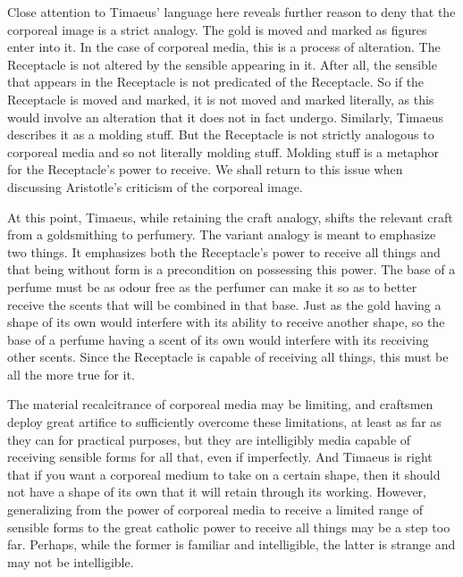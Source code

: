 Close attention to Timaeus' language here reveals further reason to deny that the corporeal image is a strict analogy. The gold is moved and marked as figures enter into it. In the case of corporeal media, this is a process of alteration. The Receptacle is not altered by the sensible appearing in it. After all, the sensible that appears in the Receptacle is not predicated of the Receptacle. So if the Receptacle is moved and marked, it is not moved and marked literally, as this would involve an alteration that it does not in fact undergo. Similarly, Timaeus describes it as a molding stuff. But the Receptacle is not strictly analogous to corporeal media and so not literally molding stuff. Molding stuff is a metaphor for the Receptacle's power to receive. We shall return to this issue when discussing Aristotle's criticism of the corporeal image.


At this point, Timaeus, while retaining the craft analogy, shifts the relevant craft from a goldsmithing to perfumery. The variant analogy is meant to emphasize two things. It emphasizes both the Receptacle's power to receive all things and that being without form is a precondition on possessing this power. The base of a perfume must be as odour free as the perfumer can make it so as to better receive the scents that will be combined in that base. Just as the gold having a shape of its own would interfere with its ability to receive another shape, so the base of a perfume having a scent of its own would interfere with its receiving other scents. Since the Receptacle is capable of receiving all things, this must be all the more true for it.

The material recalcitrance of corporeal media may be limiting, and craftsmen deploy great artifice to sufficiently overcome these limitations, at least as far as they can for practical purposes, but they are intelligibly media capable of receiving sensible forms for all that, even if imperfectly. And Timaeus is right that if you want a corporeal medium to take on a certain shape, then it should not have a shape of its own that it will retain through its working. However, generalizing from the power of corporeal media to receive a limited range of sensible forms to the great catholic power to receive all things may be a step too far. Perhaps, while the former is familiar and intelligible, the latter is strange and may not be intelligible.

